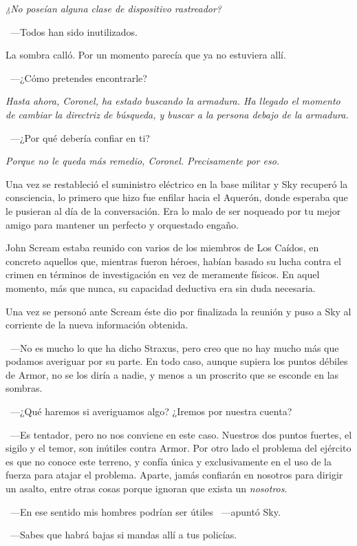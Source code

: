 \emph{¿No poseían alguna clase de dispositivo rastreador?}

~---Todos han sido inutilizados.

La sombra calló. Por un momento parecía que ya no estuviera allí.

~---¿Cómo pretendes encontrarle?

\emph{Hasta ahora, Coronel, ha estado buscando la armadura. Ha llegado el momento de cambiar la directriz de búsqueda, y buscar a la persona debajo de la armadura.}

~---¿Por qué debería confiar en ti?

\emph{Porque no le queda más remedio, Coronel. Precisamente por eso.}

\bigskip\noindent
Una vez se restableció el suministro eléctrico en la base militar y Sky recuperó la consciencia, lo primero que hizo fue enfilar hacia el Aquerón, donde esperaba que le pusieran al día de la conversación. Era lo malo de ser noqueado por tu mejor amigo para mantener un perfecto y orquestado engaño.

John Scream estaba reunido con varios de los miembros de Los Caídos, en concreto aquellos que, mientras fueron héroes, habían basado su lucha contra el crimen en términos de investigación en vez de meramente físicos. En aquel momento, más que nunca, su capacidad deductiva era sin duda necesaria.

Una vez se personó ante Scream éste dio por finalizada la reunión y puso a Sky al corriente de la nueva información obtenida.

~---No es mucho lo que ha dicho Straxus, pero creo que no hay mucho más que podamos averiguar por su parte. En todo caso, aunque supiera los puntos débiles de Armor, no se los diría a nadie, y menos a un proscrito que se esconde en las sombras.

~---¿Qué haremos si averiguamos algo? ¿Iremos por nuestra cuenta?

~---Es tentador, pero no nos conviene en este caso. Nuestros dos puntos fuertes, el sigilo y el temor, son inútiles contra Armor. Por otro lado el problema del ejército es que no conoce este terreno, y confía única y exclusivamente en el uso de la fuerza para atajar el problema. Aparte, jamás confiarán en nosotros para dirigir un asalto, entre otras cosas porque ignoran que exista un \emph{nosotros}.

~---En ese sentido mis hombres podrían ser útiles ~---apuntó Sky.

~---Sabes que habrá bajas si mandas allí a tus policías.


